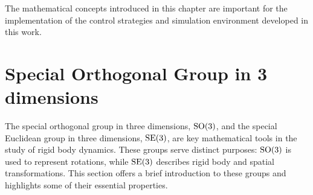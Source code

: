 The mathematical concepts introduced in this chapter are important for the implementation of the control strategies and simulation environment developed in this work.


\section{Special Orthogonal Group in 3 dimensions}
\label{sec:bp:so3_se3}

The special orthogonal group in three dimensions, $\operatorname{SO}(3)$, and the special
Euclidean group in three dimensions, $\operatorname{SE}(3)$, are key mathematical tools in the
study of rigid body dynamics. These groups serve distinct purposes: $\operatorname{SO}(3)$ is
used to represent rotations, while $\operatorname{SE}(3)$ describes rigid body and spatial
transformations. This section offers a brief introduction to these groups and
highlights some of their essential properties.

